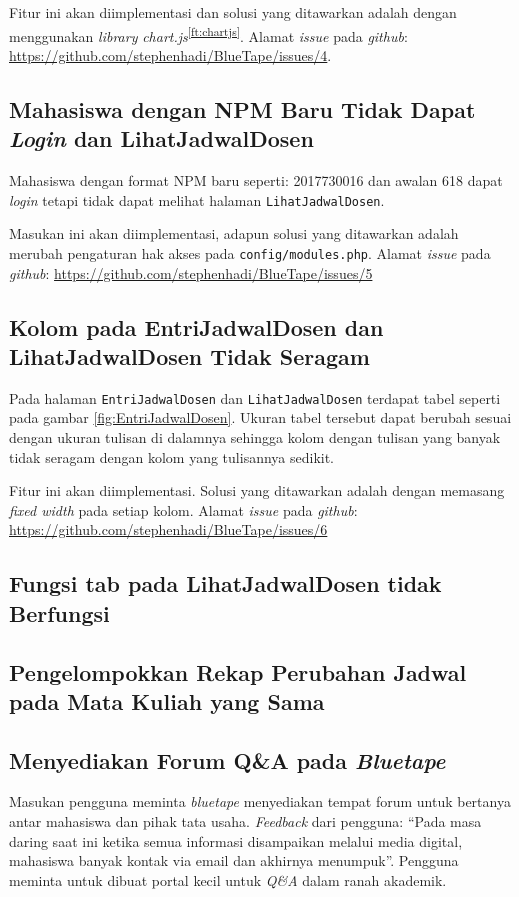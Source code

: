 Fitur ini akan diimplementasi dan solusi yang ditawarkan adalah dengan menggunakan \textit{library} \textit{chart.js}\textsuperscript{\ref{ft:chartjs}}. Alamat \textit{issue} pada \textit{github}: \url{https://github.com/stephenhadi/BlueTape/issues/4}.

\subsection{Mahasiswa dengan NPM Baru Tidak Dapat \textit{Login} dan LihatJadwalDosen}
\label{issue:5}
Mahasiswa dengan format NPM baru seperti: 2017730016 dan awalan 618 dapat \textit{login} tetapi tidak dapat melihat halaman \texttt{LihatJadwalDosen}. 

Masukan ini akan diimplementasi, adapun solusi yang ditawarkan adalah merubah {peng\-a\-turan} hak akses pada \texttt{config/modules.php}. Alamat \textit{issue} pada \textit{github}: \url{https://github.com/stephenhadi/BlueTape/issues/5} 

\subsection{Kolom pada EntriJadwalDosen dan LihatJadwalDosen Tidak Seragam}
\label{issue:6} 
Pada halaman \texttt{EntriJadwalDosen} dan \texttt{LihatJadwalDosen} terdapat tabel seperti pada gambar \ref{fig:EntriJadwalDosen}. Ukuran tabel tersebut dapat berubah sesuai dengan ukuran tulisan di dalamnya sehingga kolom dengan tulisan yang banyak tidak seragam dengan kolom yang tulisannya sedikit.

Fitur ini akan diimplementasi. Solusi yang ditawarkan adalah dengan memasang \textit{fixed width} pada setiap kolom. Alamat \textit{issue} pada \textit{github}: \url{https://github.com/stephenhadi/BlueTape/issues/6} 

\subsection{Fungsi tab pada LihatJadwalDosen tidak Berfungsi}
\label{issue:7}
\subsection{Pengelompokkan Rekap Perubahan Jadwal pada Mata Kuliah yang Sama}
\label{issue:8}
\subsection{Menyediakan Forum Q\&A pada \textit{Bluetape}}
\label{issue:9}
Masukan pengguna meminta \textit{bluetape} menyediakan tempat forum untuk bertanya antar mahasiswa dan pihak tata usaha. \textit{Feedback} dari pengguna: ``Pada masa daring saat ini ketika semua informasi disampaikan melalui media digital, mahasiswa banyak kontak via email dan akhirnya menumpuk''.  Pengguna meminta untuk dibuat portal kecil untuk \textit{Q\&A} dalam ranah akademik.

